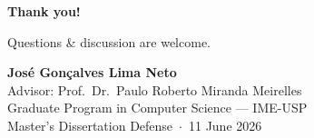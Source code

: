 \documentclass[
  xcolor={hyperref,svgnames,x11names,table},
  hyperref={pdfencoding=unicode,plainpages=false,pdfpagelabels=true,breaklinks=true},
  brazilian,english,12pt,aspectratio=169,
]{beamer}
\begin{document}
\makeatletter
{
  \begin{frame}[plain]
    \vspace*{1.5\baselineskip}
    \begin{minipage}{0.66\paperwidth}
      \raggedright
      {\Huge\bfseries{}\color{fg} Thank you!}\par
      \vspace{0.6\baselineskip}
      {\large Questions \& discussion are welcome.}\par
      \vspace{1.2\baselineskip}
      {\small
        \textbf{José Gonçalves Lima Neto}\\[0.25em]
        Advisor: Prof.\ Dr.\ Paulo Roberto Miranda Meirelles\\
        Graduate Program in Computer Science --- IME-USP\\[0.5em]
        Master's Dissertation Defense \,$\cdot$\, 11 June 2026
      }
    \end{minipage}
  \end{frame}
}
\makeatother
\end{document}
